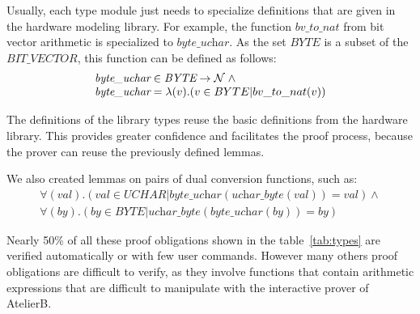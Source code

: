 \documentclass[a4paper]{llncs}
\begin{document}
Usually, each type module just needs to specialize definitions that
are given in the hardware modeling library.  For example, the function
$\textit{bv\_to\_nat}$ from bit vector arithmetic is specialized to
$\textit{byte\_uchar}$. As the set $\textit{BYTE}$ is a subset of the
$\textit{BIT\_VECTOR}$, this function can be defined as follows:
$$
\begin{array}{l}
\textit{byte\_uchar} \in \textit{BYTE} \fun \nat \land \\
\textit{byte\_uchar} = \lambda (v) . ( v \in BYTE | bv\_to\_nat(v) )
\end{array}
$$

The definitions of the library types reuse the basic definitions from
the hardware library. This provides greater confidence and facilitates
the proof process, because the prover can reuse the previously defined
lemmas.


%

We also created lemmas on pairs of dual conversion functions, such as:
$$
 \begin{array}{l}
  \forall (val) . (val \in \textit{UCHAR} |
  \textit{byte\_uchar}(\textit{uchar\_byte}(val)) = val) \land\\
  \forall (by) . (by \in \textit{BYTE} |
  \textit{uchar\_byte}(\textit{byte\_uchar}(by)) = by)
 \end{array}
$$


Nearly 50\% of all these proof obligations shown in the
table~\ref{tab:types} are verified automatically or with few user
commands. However many others proof obligations are difficult to
verify, as they involve functions that contain arithmetic expressions
that are difficult to manipulate with the interactive prover of
AtelierB.
\end{document}
